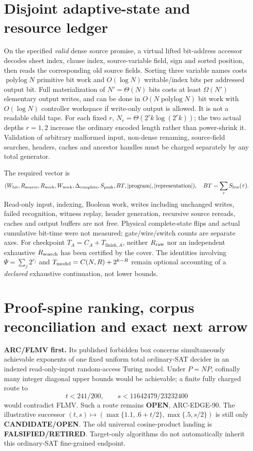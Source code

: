 \documentclass[11pt]{article}
\begin{document}
\section{Disjoint adaptive-state and resource ledger}
On the specified \emph{valid} dense source promise, a virtual lifted
bit-address accessor decodes sheet index, clause index, source-variable
field, sign and sorted position, then reads the corresponding old source
fields. Sorting three variable names costs
\(\operatorname{polylog}N\) primitive bit work and
\(O(\log N)\) writable/index bits per addressed output bit.
Full materialization of \(N'=\Theta(N)\) bits costs at least
\(\Omega(N')\) elementary output writes, and can be done in
\(O(N\operatorname{polylog}N)\) bit work with
\(O(\log N)\) controller workspace if write-only output is allowed.
It is not a readable child tape. For each fixed \(r\),
\(N_r=\Theta(2^r k\log(2^rk))\); the two actual depths \(r=1,2\)
increase the ordinary encoded length rather than power-shrink it.
Validation of arbitrary malformed input, non-dense renaming,
source-field searches, headers, caches and ancestor handles must be
charged separately by any total generator.

The required vector is
\[
(W_{\rm bit},R_{\rm source},R_{\rm work},W_{\rm work},
\Delta_{\rm complete},S_{\rm peak},BT,
|\text{program}|,|\text{representation}|),\quad
BT=\sum_\tau S_{\rm live}(\tau).
\]
Read-only input, indexing, Boolean work, writes including unchanged
writes, failed recognition, witness replay, header generation, recursive
source rereads, caches and output buffers are not free.
Physical complete-state flips and actual cumulative bit-time were not
measured; gate/wire/switch counts are separate axes.
For checkpoint \(T_A=C_A+T_{\mathrm{finish},A}\), neither
\(R_{\rm raw}\) nor an independent exhaustive \(R_{\rm search}\) has been
certified by the cover. The identities involving
\(\Psi=\sum_j2^{r_j}\) and
\(T_{\rm model}=C(N,R)+2^{k-R}\) remain optional accounting of a
\emph{declared} exhaustive continuation, not lower bounds.

\section{Proof-spine ranking, corpus reconciliation and exact next arrow}
\textbf{ARC/FLMV first.} Its published forbidden box concerns
simultaneously achievable exponents of one fixed uniform total
ordinary-SAT decider in an indexed read-only-input random-access
Turing model. Under \(P=NP\), cofinally many integer diagonal upper
bounds would be achievable; a finite fully charged route to
\[
t<241/200,\qquad s<11642479/23232400
\]
would contradict FLMV. Such a route remains \textbf{OPEN},
ARC-EDGE-90. The illustrative successor
\((t,s)\mapsto(\max\{1.1,.6+t/2\},\max\{.5,s/2\})\)
is still only \textbf{CANDIDATE/OPEN}.
The old universal cosine-product landing is
\textbf{FALSIFIED/RETIRED}. Target-only algorithms do not
automatically inherit this ordinary-SAT fine-grained endpoint.
\end{document}

